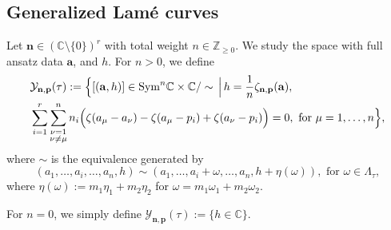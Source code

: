 \documentclass[11pt]{amsart}
\theoremstyle{remark}
\numberwithin{equation}{section}
\begin{document}
\subsection{Generalized Lam\'e curves}
Let $\mathbf{n} \in (\mathbb{C} \setminus \{0\})^r$ with total weight $n \in \mathbb Z_{\geq 0}$. We study the space with full ansatz data $\mathbf{a}$, and $h$. For $n>0$, we define 
\[
\begin{split}
&\mathcal{Y}_{\mathbf{n},\mathbf{p}}(\tau) := \Big\{  
[(\mathbf{a},h)] \in {\rm Sym}^n \mathbb C\times \mathbb C/\sim \,\Big| \, h=\frac{1}{n}\zeta_{\mathbf{n},\mathbf{p}} (\mathbf{a}),
\\
&\sum_{i = 1}^{r} \sum_{\substack{\nu = 1 \\ \nu \neq \mu}}^n 
n_i\Big(
\zeta(a_\mu - a_\nu) - \zeta(a_\mu - p_{i}) +  \zeta(a_\nu - p_{i})
\Big) = 0,  
\text{ for }\mu=1,\dots,n
\Big\},
\end{split}
\]
where $\sim$ is the equivalence generated by
\[
(a_1,\dots,a_i,\dots,a_n,h)\sim (a_1,\dots,a_i+\omega,\dots,a_n,h+\eta(\omega)), \text{ for }\omega \in \Lambda_\tau,
\]
where $\eta(\omega) := m_1 \eta_1 + m_2 \eta_2$ for $\omega = m_1 \omega_1 + m_2 \omega_2$.

For $n=0$, we simply define $\mathcal{Y}_{\mathbf{n},\mathbf{p}}(\tau) := \{  h \in \mathbb{C}  \}.$
\end{document}
